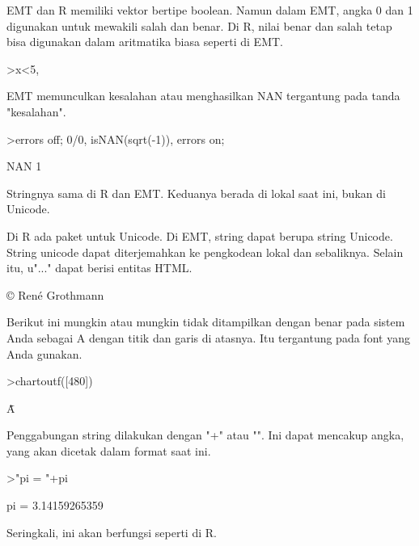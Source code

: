 \documentclass[a4paper,10pt]{article}
\begin{document}
\begin{eulernotebook}
\begin{eulercomment}
\begin{eulercomment}
\begin{eulercomment}
EMT dan R memiliki vektor bertipe boolean. Namun dalam EMT, angka 0
dan 1 digunakan untuk mewakili salah dan benar. Di R, nilai benar dan
salah tetap bisa digunakan dalam aritmatika biasa seperti di EMT.
\end{eulercomment}
\begin{eulerprompt}
>x<5, %
\end{eulerprompt}
\begin{euleroutput}
  [0,  0,  1,  0,  0]
  [0,  0,  3.1,  0,  0]
\end{euleroutput}
\begin{eulercomment}
EMT memunculkan kesalahan atau menghasilkan NAN tergantung pada tanda
"kesalahan".
\end{eulercomment}
\begin{eulerprompt}
>errors off; 0/0, isNAN(sqrt(-1)), errors on;
\end{eulerprompt}
\begin{euleroutput}
  NAN
  1
\end{euleroutput}
\begin{eulercomment}
Stringnya sama di R dan EMT. Keduanya berada di lokal saat ini, bukan
di Unicode.

Di R ada paket untuk Unicode. Di EMT, string dapat berupa string
Unicode. String unicode dapat diterjemahkan ke pengkodean lokal dan
sebaliknya. Selain itu, u"..." dapat berisi entitas HTML.
\end{eulercomment}
\begin{euleroutput}
  © René Grothmann
\end{euleroutput}
\begin{eulercomment}
Berikut ini mungkin atau mungkin tidak ditampilkan dengan benar pada
sistem Anda sebagai A dengan titik dan garis di atasnya. Itu
tergantung pada font yang Anda gunakan.
\end{eulercomment}
\begin{eulerprompt}
>chartoutf([480])
\end{eulerprompt}
\begin{euleroutput}
  Ǡ
\end{euleroutput}
\begin{eulercomment}
Penggabungan string dilakukan dengan "+" atau "\textbar{}". Ini dapat mencakup
angka, yang akan dicetak dalam format saat ini.
\end{eulercomment}
\begin{eulerprompt}
>"pi = "+pi
\end{eulerprompt}
\begin{euleroutput}
  pi = 3.14159265359
\end{euleroutput}
\begin{eulercomment}
Seringkali, ini akan berfungsi seperti di R.


\end{eulercomment}
\end{eulercomment}
\end{eulercomment}
\end{eulernotebook}
\end{document}
